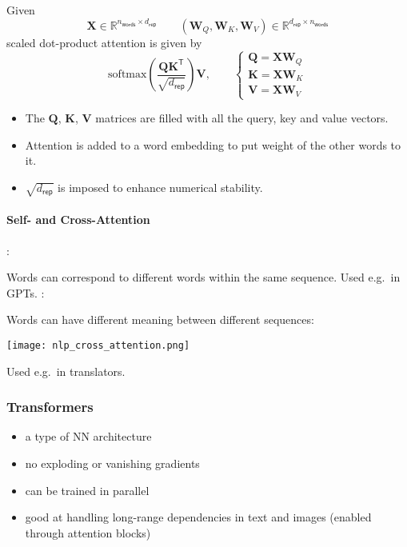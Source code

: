 \begin{examplesection}
    Given
    \noindent\begin{equation*}
        \mathbf{X}\in \mathbb{R}^{n_{\mathsf{words}} \times d_{\mathsf{rep}}}\qquad (\mathbf{W}_Q, \mathbf{W}_K, \mathbf{W}_V)\in \mathbb{R}^{d_{\mathsf{rep}}\times n_{\mathsf{words}}}
    \end{equation*}
    scaled dot-product attention is given by
    \noindent\begin{equation*}
        \mathrm{softmax}\left(\frac{\mathbf{QK}^{\mathsf{T}}}{\sqrt{d_{\mathsf{rep}}}}\right) \mathbf{V},\qquad
        \begin{cases}
            \mathbf{Q} = \mathbf{XW}_Q \\
            \mathbf{K} = \mathbf{XW}_K \\
            \mathbf{V} = \mathbf{XW}_V
        \end{cases}
    \end{equation*}
    \newpar{}
    \begin{itemize}
        \item The $\mathbf{Q}$, $\mathbf{K}$, $\mathbf{V}$ matrices are filled with all the query, key and value vectors. 
        \item Attention is added to a word embedding to put weight of the other words to it.
        \item $\sqrt{d_{\mathsf{rep}}}$ is imposed to enhance numerical stability.
    \end{itemize}
\end{examplesection}

\paragraph{Self- and Cross-Attention}

:

Words can correspond to different words within the same sequence. Used e.g.\ in GPTs.
\newpar{}
:

Words can have different meaning between different sequences:

\begin{center}
    \texttt{[image: nlp\_cross\_attention.png]}
\end{center}
Used e.g.\ in translators.

\subsubsection{Transformers}
\newpar{}
\begin{itemize}
    \item a type of NN architecture
    \item no exploding or vanishing gradients
    \item can be trained in parallel
    \item good at handling long-range dependencies in text and images (enabled through attention blocks)
\end{itemize}
